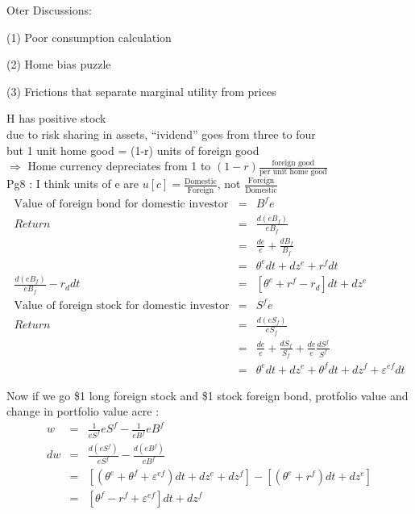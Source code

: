 \documentclass[]{article}
\begin{document}
Oter Discussions:
\begin{list}{ }{}
\item (1) Poor consumption calculation
\item (2) Home bias puzzle
\item (3) Frictions that separate marginal utility from prices
\end{list}

H has positive stock\\
due to risk sharing in assets, ``ividend'' goes from three to four\\
but 1 unit home good = (1-r) units of foreign good\\
$\Rightarrow $ Home currency depreciates from 1 to $(1-r) \frac{\mbox{foreign good}}{\mbox{per unit home good}}$\\

Pg8 : I think units of e are $u[c] = \frac{\mbox{Domestic}}{\mbox{Foreign}}$, not $\frac{\mbox{Foreign}}{\mbox{Domestic}}$\\

\begin{eqnarray}
\mbox{Value of foreign bond for domestic investor} &=& B^f e\nonumber\\
Return &=& \frac{d(eB_f)}{eB_f} \nonumber\\
&=& \frac{de}{e} + \frac{dB_f}{B_f} \nonumber\\
&=& \theta^e dt + dz^e+r^f dt\nonumber\\
\frac{d(eB_f)}{eB_f} - r_ddt &=& [\theta^e + r^f -r_d]dt + dz^e\\
\mbox{Value of foreign stock for domestic investor} &=& S^f e\nonumber\\
Return &=& \frac{d(eS_f)}{eS_f} \nonumber\\
&=& \frac{de}{e} + \frac{dS_f}{S_f} + \frac{de}{e} \frac{dS^f}{S^f} \nonumber\\
&=& \theta^e dt + dz^e+ \theta^f dt + dz^f + \varepsilon^{ef} dt
\end{eqnarray}

Now if we go \$1 long foreign stock and \$1 stock foreign bond, protfolio value and change in portfolio value acre : 
\begin{eqnarray*}
w&=& \frac{1}{eS^f} eS^f - \frac{1}{eB^f} eB^f\\
dw &=& \frac{d(eS^f)}{eS^f} - \frac{d(eB^f)}{eB^f}\\
&=& [(\theta^e + \theta^f + \varepsilon^{ef})dt + dz^e + dz^f] - [(\theta^e + r^f)dt + dz^e]\\
&=& [\theta^f - r^f + \varepsilon^{ef}]dt + dz^f
\end{eqnarray*}
\end{document}
